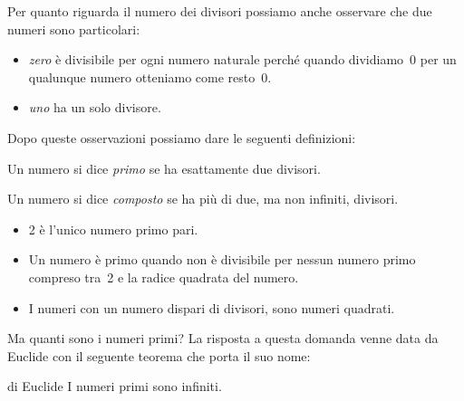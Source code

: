 Per quanto riguarda il numero dei divisori possiamo anche osservare che 
due numeri sono particolari:

\begin{itemize} [nosep]
\item \emph{zero} è divisibile per ogni numero naturale perché quando 
dividiamo~0 per un qualunque numero otteniamo come resto~0.
\item \emph{uno} ha un solo divisore.
\end{itemize}

Dopo queste osservazioni possiamo dare le seguenti definizioni:

\begin{definizione}{}{}
Un numero si dice \emph{primo} se ha esattamente due divisori. 
\end{definizione}


\begin{definizione}{}{}
Un numero si dice \emph{composto} se ha più di due, ma non infiniti, 
divisori. 
\end{definizione}


\begin{osservazioni}{}{}
\begin{itemize} [nosep]
\item 2 è l'unico numero primo pari.
\item Un numero è primo quando non è divisibile per nessun numero 
primo compreso tra~2 e la radice quadrata del numero.
\item I numeri con un numero dispari di divisori, sono numeri quadrati.
\end{itemize}
\end{osservazioni}


\vspace{1em}
Ma quanti sono i numeri primi? La risposta a questa domanda venne data da 
Euclide con il seguente teorema che porta il suo nome:

\begin{teorema}{di Euclide}{}
I numeri primi sono infiniti.
\end{teorema}

